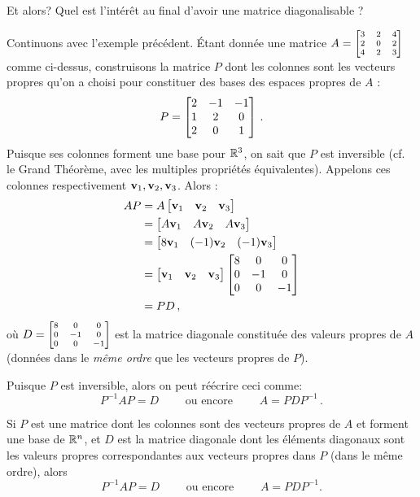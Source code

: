 \medskip
Et alors? Quel est l'intérêt au final d'avoir une matrice diagonalisable ?

Continuons avec l'exemple précédent. Étant donnée une matrice $A =  \scriptsize\left[ \begin{matrix} 3 & 2 & 4\\ 2& 0 & 2\\ 4 & 2 & 3 \end{matrix} \right]$ comme ci-dessus, construisons
la matrice $P$ dont les colonnes sont les vecteurs propres qu'on a choisi pour constituer des bases des espaces propres de $A$ :
$$
P = \left[ \begin{matrix} 2 & -1 & -1 \\ 1 & 2 & 0\\ 2 & 0 & 1 \end{matrix} \right]\,.
$$
Puisque ses colonnes forment une base pour $\mathbb{R}^3$, on sait que $P$ est inversible (cf. le Grand Théorème, avec les multiples propriétés équivalentes).  Appelons ces
colonnes respectivement $\mathbf{v}_1, \mathbf{v}_2, \mathbf{v}_3$.
Alors :
\begin{align*}
AP &= A\left[ \begin{matrix} \mathbf{v}_1 & \mathbf{v}_2 & \mathbf{v}_3 \end{matrix} \right] \\
&=  \left[ \begin{matrix} A\mathbf{v}_1 & A\mathbf{v}_2 & A\mathbf{v}_3 \end{matrix} \right]\\
&= \left[ \begin{matrix} 8\mathbf{v}_1 & (-1)\mathbf{v}_2 & (-1)\mathbf{v}_3 \end{matrix} \right]\\
&= \left[ \begin{matrix} \mathbf{v}_1 & \mathbf{v}_2 & \mathbf{v}_3 \end{matrix} \right]\left[ \begin{matrix} 8 & 0 & 0\\ 0 & -1 & 0\\ 0 & 0 & -1 \end{matrix} \right]\\
&= PD\,,
\end{align*}
où $D = \scriptsize \left[ \begin{matrix} 8 & 0 & 0\\ 0 & -1 & 0\\ 0 & 0 & -1 \end{matrix} \right]$ est la matrice diagonale constituée des valeurs propres de $A$
(données dans le {\it même ordre} que les vecteurs propres de $P$).

Puisque $P$ est inversible, alors on peut r\'e\'ecrire ceci comme:
$$
 P^{-1}AP=D\qquad \text{ ou encore }\qquad A = PDP^{-1}\,.
$$

\begin{proposition}
Si $P$ est une matrice dont les colonnes sont des vecteurs propres 
de $A$ et forment une base de $\mathbb{R}^n$, et $D$ est la matrice diagonale dont les éléments diagonaux
sont les valeurs propres correspondantes aux vecteurs propres dans $P$ (dans le même ordre), alors
$$
 P^{-1}AP=D\qquad \text{ ou encore }\qquad A = PDP^{-1}.
$$
\end{proposition}

